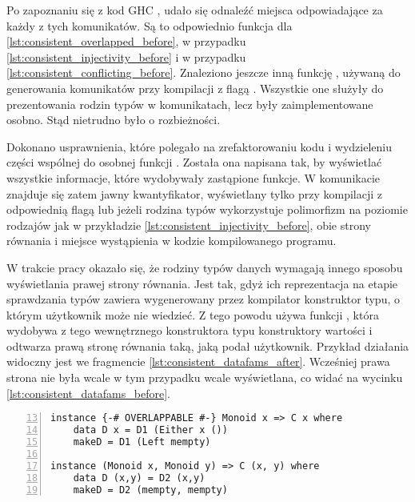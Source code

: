 Po zapoznaniu się z kod GHC , udało się odnaleźć miejsca odpowiadające za każdy z
tych komunikatów. Są to odpowiednio funkcja  dla
\ref{lst:consistent_overlapped_before},  w przypadku
\ref{lst:consistent_injectivity_before} i  w przypadku
\ref{lst:consistent_conflicting_before}. Znaleziono jeszcze inną funkcję
, używaną do generowania komunikatów przy kompilacji z flagą
. Wszystkie one służyły do prezentowania rodzin typów w
komunikatach, lecz były zaimplementowane osobno. Stąd nietrudno było o
rozbieżności. 

Dokonano usprawnienia, które polegało na zrefaktorowaniu kodu i wydzieleniu
części wspólnej do osobnej funkcji . Została ona napisana tak, by wyświetlać wszystkie
informacje, które wydobywały zastąpione funkcje. W komunikacie znajduje się
zatem jawny kwantyfikator, wyświetlany tylko przy kompilacji z odpowiednią flagą
lub jeżeli rodzina typów wykorzystuje polimorfizm na poziomie rodzajów jak w
przykładzie \ref{lst:consistent_injectivity_before}, obie strony równania i
miejsce wystąpienia w kodzie kompilowanego programu.

W trakcie pracy okazało się, że rodziny typów danych wymagają innego sposobu
wyświetlania prawej strony równania. Jest tak, gdyż ich reprezentacja na etapie
sprawdzania typów zawiera wygenerowany przez kompilator konstruktor typu, o
którym użytkownik może nie wiedzieć. Z tego powodu  używa
funkcji , która wydobywa z tego wewnętrznego konstruktora typu
konstruktory wartości i odtwarza prawą stronę równania taką, jaką podał
użytkownik. Przykład działania widoczny jest we fragmencie
\ref{lst:consistent_datafams_after}. Wcześniej prawa strona nie była wcale w tym
przypadku wcale wyświetlana, co widać na wycinku
\ref{lst:consistent_datafams_before}.

\begin{lstlisting}[float,numbers=left,firstnumber=13,label={lst:consistent_datafams_code},
                   caption={Fragment testu T9371 z rodziną typów danych powiązaną z klasą \code{C} i równaniami o nachodzących na siebie dziedzinach.}]
instance {-# OVERLAPPABLE #-} Monoid x => C x where
    data D x = D1 (Either x ())
    makeD = D1 (Left mempty)

instance (Monoid x, Monoid y) => C (x, y) where
    data D (x,y) = D2 (x,y)
    makeD = D2 (mempty, mempty)
\end{lstlisting}

